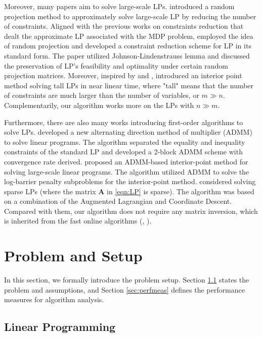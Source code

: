 \documentclass{article} %
\begin{document}
Moreover, many papers aim to solve large-scale LPs. \cite{vu2018random} introduced a random projection method to approximately solve large-scale LP by reducing the number of constraints. Aligned with the previous works on constraints reduction \citep{de2004constraint, lakshminarayanan2017linearly} that dealt the approximate LP associated with the MDP problem, \cite{vu2018random} employed the idea of random projection and developed a constraint reduction scheme for LP in its standard form. The paper utilized Johnson-Lindenstrauss lemma and discussed the preservation of LP's feasibility and optimality under certain random projection matrices. Moreover, inspired by \cite{lee2014path} and \cite{lee2019solving}, \cite{van2020solving} introduced an interior point method solving tall LPs in near linear time, where "tall" means that the number of constraints are much larger than the number of variables, or $m\gg n$. Complementarily, our algorithm works more on the LPs with $n\gg m$.


Furthermore, there are also many works introducing first-order algorithms to solve LPs. \cite{wang2017new} developed a new alternating direction method of multiplier (ADMM) to solve linear programs. The algorithm separated the equality and inequality constraints of the standard LP and developed a 2-block ADMM scheme with convergence rate derived. \cite{lin2021admm} proposed an ADMM-based interior-point method for solving large-scale linear programs. The algorithm utilized ADMM to solve the log-barrier penalty subproblems for the interior-point method. \cite{yen2015sparse} considered solving sparse LPs (where the matrix $\bm{A}$ in \eqref{eqn:LP} is sparse). The algorithm was based on a combination of the Augmented Lagrangian and Coordinate Descent. Compared with them, our algorithm does not require any matrix inversion, which is inherited from the fast online algorithms (\cite{li2020simple}, \cite{balseiro2020dual}).



\section{Problem and Setup}
\label{sec:ps}
In this section, we formally introduce the problem setup. Section \ref{sec:problem} states the problem and assumptions, and Section \ref{sec:perfmeas} defines the performance measures for algorithm analysis. 

\subsection{Linear Programming}
\label{sec:problem}
\end{document}
